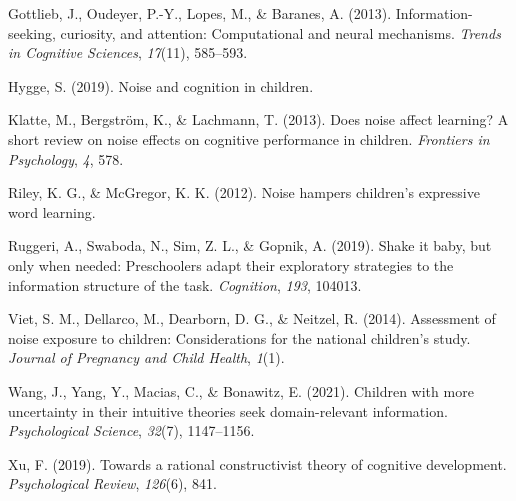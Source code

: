 \documentclass[10pt, letterpaper]{article}
\begin{document}
\leavevmode\hypertarget{ref-gottlieb2013}{}%
Gottlieb, J., Oudeyer, P.-Y., Lopes, M., \& Baranes, A. (2013).
Information-seeking, curiosity, and attention: Computational and neural
mechanisms. \emph{Trends in Cognitive Sciences}, \emph{17}(11),
585--593.

\leavevmode\hypertarget{ref-hygge2019}{}%
Hygge, S. (2019). Noise and cognition in children.

\leavevmode\hypertarget{ref-klatte2013}{}%
Klatte, M., Bergström, K., \& Lachmann, T. (2013). Does noise affect
learning? A short review on noise effects on cognitive performance in
children. \emph{Frontiers in Psychology}, \emph{4}, 578.

\leavevmode\hypertarget{ref-riley2012}{}%
Riley, K. G., \& McGregor, K. K. (2012). Noise hampers children's
expressive word learning.

\leavevmode\hypertarget{ref-ruggeri2019}{}%
Ruggeri, A., Swaboda, N., Sim, Z. L., \& Gopnik, A. (2019). Shake it
baby, but only when needed: Preschoolers adapt their exploratory
strategies to the information structure of the task. \emph{Cognition},
\emph{193}, 104013.

\leavevmode\hypertarget{ref-viet2014}{}%
Viet, S. M., Dellarco, M., Dearborn, D. G., \& Neitzel, R. (2014).
Assessment of noise exposure to children: Considerations for the
national children's study. \emph{Journal of Pregnancy and Child Health},
\emph{1}(1).

\leavevmode\hypertarget{ref-wang2021}{}%
Wang, J., Yang, Y., Macias, C., \& Bonawitz, E. (2021). Children with
more uncertainty in their intuitive theories seek domain-relevant
information. \emph{Psychological Science}, \emph{32}(7), 1147--1156.

\leavevmode\hypertarget{ref-xu2019}{}%
Xu, F. (2019). Towards a rational constructivist theory of cognitive
development. \emph{Psychological Review}, \emph{126}(6), 841.


\end{document}

